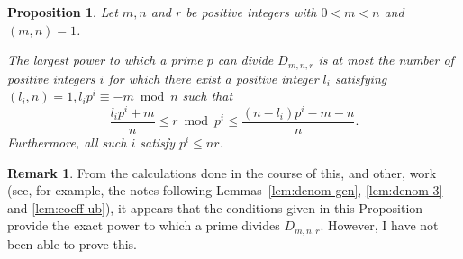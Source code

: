 \documentclass{jT}
\newtheorem{proposition}[theorem]{Proposition}
\theoremstyle{definition}
\newtheorem*{remark}{Remark}
\begin{document}
\begin{proposition}
\label{prop:denom}
Let $m,n$ and $r$ be positive integers with $0 < m < n$ and 
$(m,n)=1$.

The largest power to which a prime $p$ can divide $D_{m,n,r}$ is at most the number
of positive integers $i$ for which there exist a positive integer $l_{i}$ satisfying
$(l_{i},n)=1, l_{i} p^{i} \equiv -m \bmod n$ such that
\begin{displaymath}
\frac{l_{i}p^{i}+m}{n} \leq r \bmod p^{i} \leq \frac{(n-l_{i})p^{i}-m-n}{n}.
\end{displaymath}
Furthermore, all such $i$ satisfy $p^{i} \leq nr$.
\end{proposition}

\begin{remark}
From the calculations done in the course of this, and other, work (see, for
example, the notes following Lemmas~\ref{lem:denom-gen}, \ref{lem:denom-3}
and \ref{lem:coeff-ub}), it appears that the conditions given in this Proposition
provide the exact power to which a prime divides $D_{m,n,r}$.
However, I have not been able to prove this. 
\end{remark}
\end{document}
